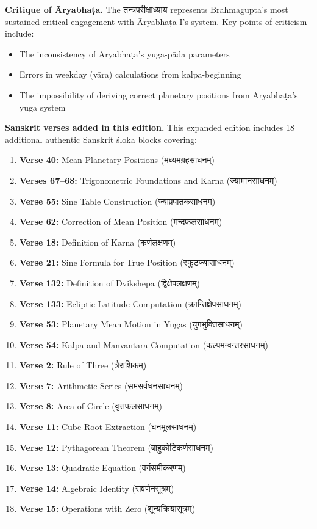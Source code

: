 \documentclass[11pt,a4paper]{article}
\newcommand{\dev}[1]{{\devanagarifont #1}}
\begin{document}
\textbf{Critique of Āryabhaṭa.} The \dev{तन्त्रपरीक्षाध्याय} represents Brahmagupta's most sustained critical engagement with Āryabhaṭa I's system. Key points of criticism include:
\begin{itemize}
  \item The inconsistency of Āryabhaṭa's yuga-pāda parameters
  \item Errors in weekday (vāra) calculations from kalpa-beginning
  \item The impossibility of deriving correct planetary positions from Āryabhaṭa's yuga system
\end{itemize}

\textbf{Sanskrit verses added in this edition.} This expanded edition includes 18 additional authentic Sanskrit śloka blocks covering:
\begin{enumerate}[leftmargin=2em]
  \item \textbf{Verse 40:} Mean Planetary Positions (\dev{मध्यमग्रहसाधनम्})
  \item \textbf{Verses 67--68:} Trigonometric Foundations and Karna (\dev{ज्यामानसाधनम्})
  \item \textbf{Verse 55:} Sine Table Construction (\dev{ज्याप्रपातकसाधनम्})
  \item \textbf{Verse 62:} Correction of Mean Position (\dev{मन्दफलसाधनम्})
  \item \textbf{Verse 18:} Definition of Karna (\dev{कर्णलक्षणम्})
  \item \textbf{Verse 21:} Sine Formula for True Position (\dev{स्फुटज्यासाधनम्})
  \item \textbf{Verse 132:} Definition of Dvikshepa (\dev{द्विक्षेपलक्षणम्})
  \item \textbf{Verse 133:} Ecliptic Latitude Computation (\dev{क्रान्तिक्षेपसाधनम्})
  \item \textbf{Verse 53:} Planetary Mean Motion in Yugas (\dev{युगभुक्तिसाधनम्})
  \item \textbf{Verse 54:} Kalpa and Manvantara Computation (\dev{कल्पमन्वन्तरसाधनम्})
  \item \textbf{Verse 2:} Rule of Three (\dev{त्रैराशिकम्})
  \item \textbf{Verse 7:} Arithmetic Series (\dev{समसर्वधनसाधनम्})
  \item \textbf{Verse 8:} Area of Circle (\dev{वृत्तफलसाधनम्})
  \item \textbf{Verse 11:} Cube Root Extraction (\dev{घनमूलसाधनम्})
  \item \textbf{Verse 12:} Pythagorean Theorem (\dev{बाहुकोटिकर्णसाधनम्})
  \item \textbf{Verse 13:} Quadratic Equation (\dev{वर्गसमीकरणम्})
  \item \textbf{Verse 14:} Algebraic Identity (\dev{सवर्णनसूत्रम्})
  \item \textbf{Verse 15:} Operations with Zero (\dev{शून्यक्रियासूत्रम्})
\end{enumerate}

\vspace{1cm}
\begin{center}
\rule{0.4\textwidth}{0.4pt}
\end{center}
\end{document}
